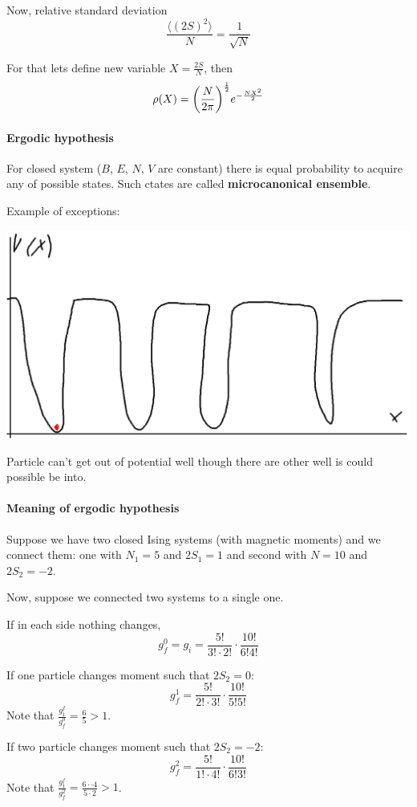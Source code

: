 Now, relative standard deviation
$$\frac{\langle (2S)^2 \rangle}{N} = \frac{1}{\sqrt{N}}$$

For that lets define new variable $X = \frac{2S}{N}$, then
$$\rho(X) = \qty(\frac{N}{2\pi})^{\frac{1}{2}} e^{-\frac{NX^2}{2}}$$
\paragraph{Ergodic hypothesis}
For closed system ($B$, $E$, $N$, $V$ are constant) there is equal probability to acquire any of possible states. Such ctates are called \textbf{microcanonical ensemble}.

Example of exceptions:
\begin{center}
	\includegraphics[width=\linewidth]{./lect4/pic1.png}
\end{center}
Particle can't get out of potential well though there are other well is could possible be into.

\paragraph{Meaning of ergodic hypothesis}
Suppose we have two closed Ising systems (with magnetic moments) and we connect them: one with $N_1=5$ and $2S_1=1$ and second with $N=10$ and $2S_2 = -2$.

Now, suppose we connected two systems to a single one.

If in each side nothing changes,
$$g^0_f = g_i = \frac{5!}{3!\cdot 2!} \cdot \frac{10!}{6!4!}$$

If one particle changes moment such that $2S_2 = 0$:
$$g^1_f = \frac{5!}{2!\cdot 3!} \cdot \frac{10!}{5!5!}$$
Note that $\frac{g_1^f}{g^0_f } = \frac{6}{5} > 1$.

If two particle changes moment such that $2S_2 = -2$:
$$g^2_f = \frac{5!}{1!\cdot 4!} \cdot \frac{10!}{6!3!}$$
Note that $\frac{g_1^f}{g^2_f } = \frac{6\cdot  \cdot 4}{ 5 \cdot 2 } > 1$.

